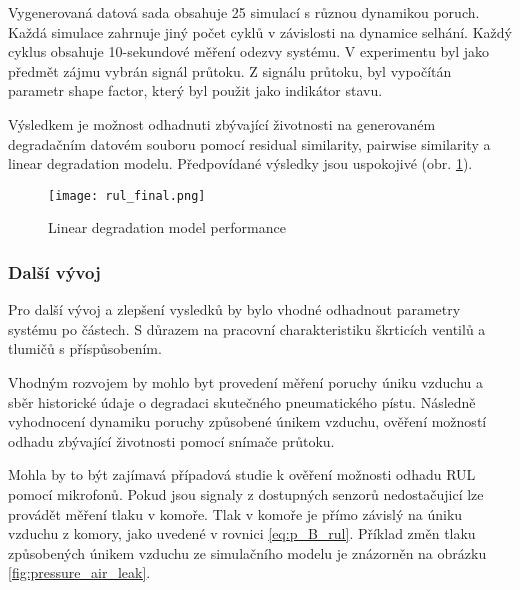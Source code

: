 Vygenerovaná datová sada obsahuje 25 simulací s různou dynamikou poruch.
Každá simulace zahrnuje jiný počet cyklů v závislosti
na dynamice selhání. Každý cyklus
obsahuje 10-sekundové měření odezvy systému. V
experimentu byl jako předmět zájmu vybrán signál průtoku. Z
signálu průtoku, byl vypočítán parametr shape factor, který byl použit jako
indikátor stavu.

Výsledkem je možnost odhadnuti zbývající životnosti
na generovaném degradačním datovém souboru pomocí residual
similarity,  pairwise similarity a linear degradation modelu.
Předpovídané výsledky jsou uspokojivé (obr. \ref{fig:rul_deg_preforms}).

\begin{figure}[h!]
    \centering
    \texttt{[image: rul\_final.png]}
    \caption{Linear degradation model performance}
    \label{fig:rul_deg_preforms}
\end{figure}


\subsubsection*{Další vývoj}

Pro další vývoj a zlepšení vysledků by bylo vhodné odhadnout
parametry systému po částech. S důrazem na
pracovní charakteristiku škrticích ventilů a tlumičů s příspůsobením.

Vhodným rozvojem by mohlo byt provedení měření poruchy úniku vzduchu a sběr
historické údaje o degradaci skutečného pneumatického pístu.
Následně vyhodnocení dynamiku poruchy způsobené únikem vzduchu,  
ověření možností odhadu zbývající životnosti pomocí snímače průtoku.

Mohla by to být zajímavá případová studie k ověření možnosti odhadu RUL
pomocí mikrofonů. Pokud jsou signaly z dostupných senzorů nedostačujicí
lze provádět měření tlaku v komoře. Tlak v
komoře je přímo závislý na úniku vzduchu z komory, jako
uvedené v rovnici \ref{eq:p_B_rul}. Příklad změn tlaku způsobených únikem vzduchu ze
simulačního modelu je znázorněn na obrázku \ref{fig:pressure_air_leak}.
